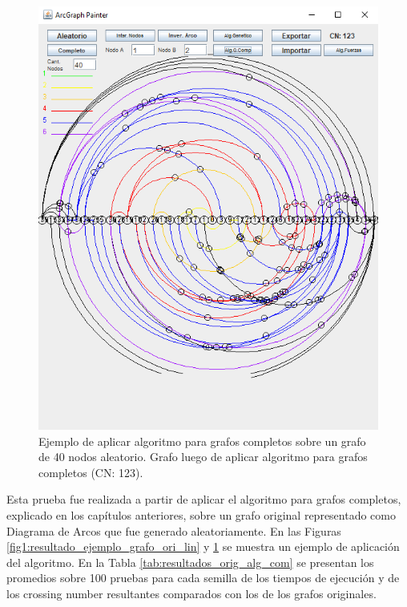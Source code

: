 \begin{figure}
	\centering
	\includegraphics[scale=0.7]{imagenes/grafo_example_ori_lin.png}
	\caption{Ejemplo de aplicar algoritmo para grafos completos sobre un grafo de 40 nodos aleatorio. Grafo luego de aplicar algoritmo para grafos completos (CN: 123).}
	\label{fig2:resultado_ejemplo_grafo_ori_lin}
\end{figure}

Esta prueba fue realizada a partir de aplicar el algoritmo para grafos completos, explicado en los capítulos anteriores, sobre un grafo original representado como Diagrama de Arcos que fue generado aleatoriamente.%
En las Figuras \ref{fig1:resultado_ejemplo_grafo_ori_lin} y \ref{fig2:resultado_ejemplo_grafo_ori_lin} se muestra un ejemplo de aplicación del algoritmo. En la Tabla \ref{tab:resultados_orig_alg_com} se  presentan los promedios sobre 100 pruebas para cada semilla de los tiempos de ejecución y de los crossing number resultantes comparados con los de los grafos originales.

